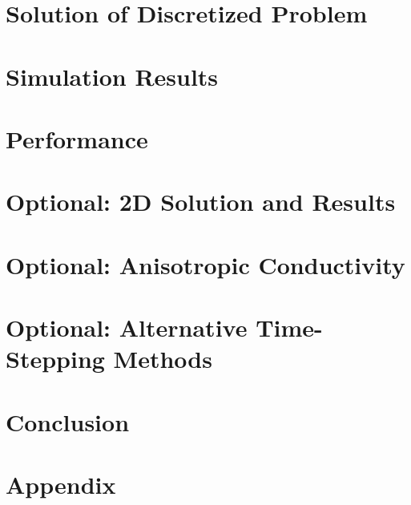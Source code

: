 \documentclass{finalproject}
\begin{document}
\section{Solution of Discretized Problem}

\section{Simulation Results}

\section{Performance}

\section{Optional: 2D Solution and Results}
\section{Optional: Anisotropic Conductivity}
\section{Optional: Alternative Time-Stepping Methods}


\section{Conclusion}

\printbibliography
\clearpage
\section*{Appendix}
\end{document}
